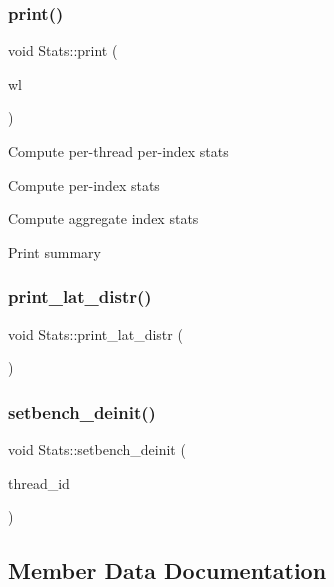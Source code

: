 \mbox{\label{classStats_a64be07bc9550d3dccfc0f1fee76853bc}} 
\subsubsection{\texorpdfstring{print()}{print()}}
{\footnotesize\ttfamily void Stats\+::print (\begin{DoxyParamCaption}\item[{\hyperlink{classworkload}{workload} $\ast$}]{wl }\end{DoxyParamCaption})}

Compute per-\/thread per-\/index stats

Compute per-\/index stats

Compute aggregate index stats

Print summary\mbox{\label{classStats_ab689dd6e501c37388d8c4bad47e135e4}} 
\subsubsection{\texorpdfstring{print\+\_\+lat\+\_\+distr()}{print\_lat\_distr()}}
{\footnotesize\ttfamily void Stats\+::print\+\_\+lat\+\_\+distr (\begin{DoxyParamCaption}{ }\end{DoxyParamCaption})}

\mbox{\label{classStats_a99204bb2a9d02ae319f187a61b6b705c}} 
\subsubsection{\texorpdfstring{setbench\+\_\+deinit()}{setbench\_deinit()}}
{\footnotesize\ttfamily void Stats\+::setbench\+\_\+deinit (\begin{DoxyParamCaption}\item[{uint64\+\_\+t}]{thread\+\_\+id }\end{DoxyParamCaption})}



\subsection{Member Data Documentation}
\mbox{\label{classStats_a0cebcc9e1772f74a3f93b8df9f07d05b}} 
